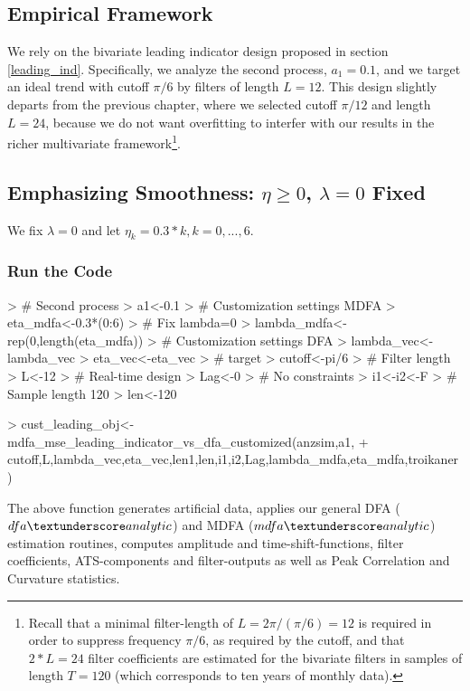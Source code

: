 \documentclass[a4paper]{book}
\begin{document}
\subsection{Empirical Framework}

We rely on the bivariate leading indicator design proposed in section \ref{leading_ind}. Specifically, we analyze the second process, $a_1=0.1$, and we target an ideal trend with cutoff $\pi/6$ by filters of length $L=12$. This design slightly departs from the previous chapter, where we selected cutoff $\pi/12$ and length $L=24$, because we do not want overfitting to interfer with our results in the richer multivariate framework\footnote{Recall that a minimal filter-length of $L=2\pi/(\pi/6)=12$ is required in order to suppress frequency $\pi/6$, as required by the cutoff, and that $2*L=24$ filter coefficients are estimated for the bivariate filters in samples of length $T=120$ (which corresponds to ten years of monthly data).}. 





\subsection{Emphasizing Smoothness: $\eta\geq 0$, $\lambda=0$ Fixed}\label{e_s_mdfa}

We fix $\lambda=0$ and let $\eta_k=0.3*k, k=0,...,6$.

\subsubsection{Run the Code}


\begin{Schunk}
\begin{Sinput}
> # Second process
> a1<-0.1
> # Customization settings MDFA
> eta_mdfa<-0.3*(0:6)
> # Fix lambda=0
> lambda_mdfa<-rep(0,length(eta_mdfa))
> # Customization settings DFA
> lambda_vec<-lambda_vec
> eta_vec<-eta_vec
> # target
> cutoff<-pi/6
> # Filter length
> L<-12
> # Real-time design
> Lag<-0
> # No constraints
> i1<-i2<-F
> # Sample length 120
> len<-120
\end{Sinput}
\end{Schunk}
\begin{Schunk}
\begin{Sinput}
> cust_leading_obj<-mdfa_mse_leading_indicator_vs_dfa_customized(anzsim,a1,
+     cutoff,L,lambda_vec,eta_vec,len1,len,i1,i2,Lag,lambda_mdfa,eta_mdfa,troikaner)  
\end{Sinput}
\end{Schunk}
The above function generates artificial data, applies our general DFA ($dfa\textunderscore analytic$) and MDFA ($mdfa\textunderscore analytic$) estimation routines, computes amplitude and time-shift-functions, filter coefficients, ATS-components and filter-outputs as well as Peak Correlation and Curvature statistics.
\end{document}
